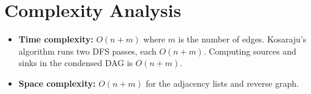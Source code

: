 \documentclass[11pt,a4paper]{article}
\begin{document}
\section{Complexity Analysis}

\begin{itemize}
  \item \textbf{Time complexity:} $O(n + m)$ where $m$ is the number of edges.
        Kosaraju's algorithm runs two DFS passes, each $O(n + m)$. Computing
        sources and sinks in the condensed DAG is $O(n + m)$.
  \item \textbf{Space complexity:} $O(n + m)$ for the adjacency lists and reverse graph.
\end{itemize}
\end{document}
